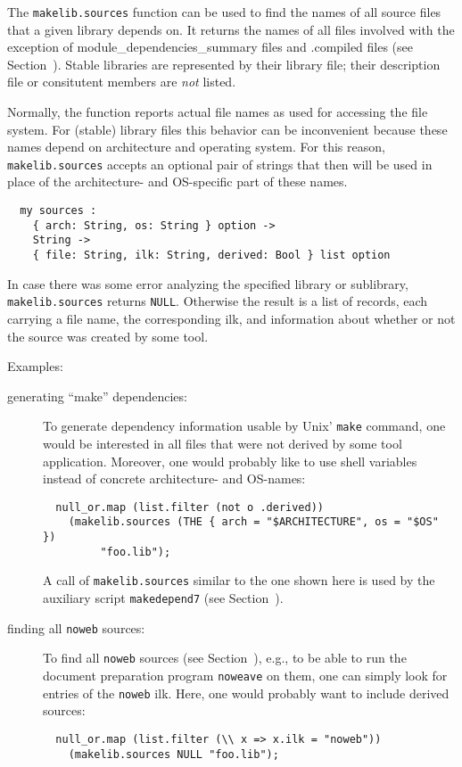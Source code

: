 The {\tt makelib.sources} function can be used to find the names of all
source files that a given library depends on.  It returns the names of
all files involved with the exception of module_dependencies_summary files and .compiled files
(see Section~).  Stable libraries are represented by
their library file; their description file or consitutent members are
{\em not} listed.

Normally, the function reports actual file names as used for accessing
the file system.  For (stable) library files this behavior can be
inconvenient because these names depend on architecture and operating
system.  For this reason, {\tt makelib.sources} accepts an optional pair of
strings that then will be used in place of the architecture- and
OS-specific part of these names.

\begin{verbatim}
  my sources :
    { arch: String, os: String } option ->
    String ->
    { file: String, ilk: String, derived: Bool } list option
\end{verbatim}

In case there was some error analyzing the specified library or sublibrary,
{\tt makelib.sources} returns {\tt NULL}.  Otherwise the result is a list
of records, each carrying a file name, the corresponding ilk, and
information about whether or not the source was created by some tool.

Examples:

\begin{description}
\item[generating ``make'' dependencies:]
To generate dependency information usable by Unix' {\tt make} command,
one would be interested in all files that were not derived by some
tool application.  Moreover, one would probably like to use shell
variables instead of concrete architecture- and OS-names:
\begin{verbatim}
  null_or.map (list.filter (not o .derived))
    (makelib.sources (THE { arch = "$ARCHITECTURE", os = "$OS" })
         "foo.lib");
\end{verbatim}
A call of {\tt makelib.sources} similar to the one shown here is used by
the auxiliary script {\tt makedepend7} (see
Section~).
\item[finding all {\tt noweb} sources:]
To find all {\tt noweb} sources (see Section~),
e.g., to be able to run the document preparation program {\tt noweave}
on them, one can simply look for entries of the {\tt noweb} ilk.
Here, one would probably want to include derived sources:
\begin{verbatim}
  null_or.map (list.filter (\\ x => x.ilk = "noweb"))
    (makelib.sources NULL "foo.lib");
\end{verbatim}
\end{description}

